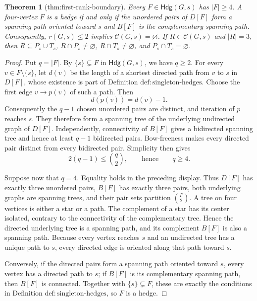 \documentclass{article}
\newtheorem{theorem}{Theorem}
\begin{document}
\begin{theorem}[thm:first-rank-boundary]\label{thm:first-rank-boundary}
Every \(F\in\mathsf{Hdg}(G,s)\) has \(|F|\geq4\). A four-vertex \(F\) is a hedge if and only if the unordered pairs of \(D[F]\) form a spanning path oriented toward \(s\) and \(B[F]\) is the complementary spanning path. Consequently, \(r(G,s)\leq2\) implies \(\mathcal C(G,s)=\varnothing\). If \(R\in\mathcal C(G,s)\) and \(|R|=3\), then \(R\subseteq P_s\cup T_s\), \(R\cap P_s\neq\varnothing\), \(R\cap T_s\neq\varnothing\), and \(P_s\cap T_s=\varnothing\).
\end{theorem}
\begin{proof}
Put \(q=|F|\).  By \(\{s\}\subsetneq F\) in
\(\mathsf{Hdg}(G,s)\), we have \(q\geq 2\).  For every
\(v\in F\setminus\{s\}\), let \(d(v)\) be the length of a shortest
directed path from \(v\) to \(s\) in \(D[F]\), whose existence is part of
Definition \(\mathrm{def{:}singleton\mbox{-}hedges}\).  Choose the first edge
\(v\to p(v)\) of such a path.  Then
\[
 d(p(v))=d(v)-1.
\]
Consequently the \(q-1\) chosen unordered pairs are distinct, and iteration
of \(p\) reaches \(s\).  They therefore form a spanning tree of the
underlying undirected graph of \(D[F]\).  Independently, connectivity of
\(B[F]\) gives a bidirected spanning tree and hence at least \(q-1\)
bidirected pairs.  Bow-freeness makes every directed pair distinct from every
bidirected pair.  Simplicity then gives
\[
 2(q-1)\leq \binom q2,
 \qquad\text{hence}\qquad q\geq4.
\]

Suppose now that \(q=4\).  Equality holds in the preceding display.  Thus
\(D[F]\) has exactly three unordered pairs, \(B[F]\) has exactly three
pairs, both underlying graphs are spanning trees, and their pair sets
partition \(\binom F2\).  A tree on four vertices is either a star or a
path.  The complement of a star has its center isolated, contrary to the
connectivity of the complementary tree.  Hence the directed underlying tree
is a spanning path, and its complement \(B[F]\) is also a spanning path.
Because every vertex reaches \(s\) and an undirected tree has a unique path
to \(s\), every directed edge is oriented along that path toward \(s\).

Conversely, if the directed pairs form a spanning path oriented toward
\(s\), every vertex has a directed path to \(s\); if \(B[F]\) is its
complementary spanning path, then \(B[F]\) is connected.  Together with
\(\{s\}\subsetneq F\), these are exactly the conditions in
Definition \(\mathrm{def{:}singleton\mbox{-}hedges}\), so \(F\) is a hedge.


\end{proof}
\end{document}
